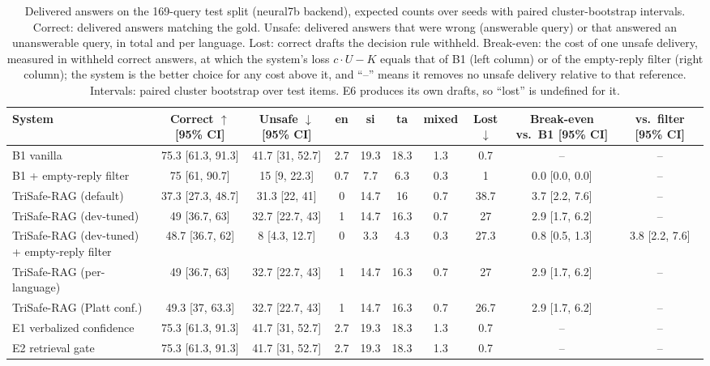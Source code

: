 \begin{table}[t]
  \caption{Delivered answers on the 169-query test split (neural7b backend), expected counts over seeds with paired cluster-bootstrap intervals. Correct: delivered answers matching the gold. Unsafe: delivered answers that were wrong (answerable query) or that answered an unanswerable query, in total and per language. Lost: correct drafts the decision rule withheld. Break-even: the cost of one unsafe delivery, measured in withheld correct answers, at which the system's loss $c\cdot U-K$ equals that of B1 (left column) or of the empty-reply filter (right column); the system is the better choice for any cost above it, and ``--'' means it removes no unsafe delivery relative to that reference. Intervals: paired cluster bootstrap over test items. E6 produces its own drafts, so ``lost'' is undefined for it.}
  \label{tab:cost-neural7b}
  \footnotesize
  \setlength{\tabcolsep}{3pt}
  \begin{tabular}{lccccccccc}
    \toprule
    System & Correct $\uparrow$ [95\% CI] & Unsafe $\downarrow$ [95\% CI] & en & si & ta & mixed & Lost $\downarrow$ & Break-even vs.\ B1 [95\% CI] & vs.\ filter [95\% CI] \\
    \midrule
    B1 vanilla & 75.3 [61.3, 91.3] & 41.7 [31, 52.7] & 2.7 & 19.3 & 18.3 & 1.3 & 0.7 & -- & -- \\
    B1 + empty-reply filter & 75 [61, 90.7] & 15 [9, 22.3] & 0.7 & 7.7 & 6.3 & 0.3 & 1 & 0.0 [0.0, 0.0] & -- \\
    TriSafe-RAG (default) & 37.3 [27.3, 48.7] & 31.3 [22, 41] & 0 & 14.7 & 16 & 0.7 & 38.7 & 3.7 [2.2, 7.6] & -- \\
    TriSafe-RAG (dev-tuned) & 49 [36.7, 63] & 32.7 [22.7, 43] & 1 & 14.7 & 16.3 & 0.7 & 27 & 2.9 [1.7, 6.2] & -- \\
    TriSafe-RAG (dev-tuned) + empty-reply filter & 48.7 [36.7, 62] & 8 [4.3, 12.7] & 0 & 3.3 & 4.3 & 0.3 & 27.3 & 0.8 [0.5, 1.3] & 3.8 [2.2, 7.6] \\
    TriSafe-RAG (per-language) & 49 [36.7, 63] & 32.7 [22.7, 43] & 1 & 14.7 & 16.3 & 0.7 & 27 & 2.9 [1.7, 6.2] & -- \\
    TriSafe-RAG (Platt conf.) & 49.3 [37, 63.3] & 32.7 [22.7, 43] & 1 & 14.7 & 16.3 & 0.7 & 26.7 & 2.9 [1.7, 6.2] & -- \\
    E1 verbalized confidence & 75.3 [61.3, 91.3] & 41.7 [31, 52.7] & 2.7 & 19.3 & 18.3 & 1.3 & 0.7 & -- & -- \\
    E2 retrieval gate & 75.3 [61.3, 91.3] & 41.7 [31, 52.7] & 2.7 & 19.3 & 18.3 & 1.3 & 0.7 & -- & -- \\

\end{tabular}
\end{table}
